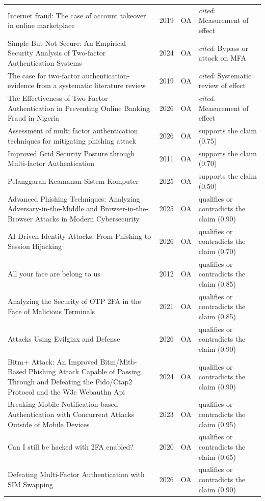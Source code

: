 \begin{longtable}{@{}%
  >{\raggedright\arraybackslash}p{}c%
  >{\raggedright\arraybackslash}p{}%
  >{\raggedright\arraybackslash}p{}@{}}
Internet fraud: The case of account takeover in online marketplace & 2019 & OA & \emph{cited}: Measurement of effect \\
Simple But Not Secure: An Empirical Security Analysis of Two-factor Authentication Systems & 2024 & OA & \emph{cited}: Bypass or attack on MFA \\
The case for two-factor authentication- evidence from a systematic literature review & 2019 & OA & \emph{cited}: Systematic review of effect \\
The Effectiveness of Two-Factor Authentication in Preventing Online Banking Fraud in Nigeria & 2026 & OA & \emph{cited}: Measurement of effect \\
Assessment of multi factor authentication techniques for mitigating phishing attack & 2026 & OA & supports the claim (0.75) \\
Improved Grid Security Posture through Multi-factor Authentication & 2011 & OA & supports the claim (0.70) \\
Pelanggaran Keamanan Sistem Komputer & 2025 & OA & supports the claim (0.50) \\
Advanced Phishing Techniques: Analyzing Adversary-in-the-Middle and Browser-in-the-Browser Attacks in Modern Cybersecurity & 2025 & OA & qualifies or contradicts the claim (0.90) \\
AI-Driven Identity Attacks: From Phishing to Session Hijacking & 2026 & OA & qualifies or contradicts the claim (0.70) \\
All your face are belong to us & 2012 & OA & qualifies or contradicts the claim (0.85) \\
Analyzing the Security of OTP 2FA in the Face of Malicious Terminals & 2021 & OA & qualifies or contradicts the claim (0.85) \\
Attacks Using Evilginx and Defense & 2026 & OA & qualifies or contradicts the claim (0.90) \\
Bitm+ Attack: An Improved Bitm/Mitb-Based Phishing Attack Capable of Passing Through and Defeating the Fido/Ctap2 Protocol and the W3c Webauthn Api & 2024 & OA & qualifies or contradicts the claim (0.90) \\
Breaking Mobile Notification-based Authentication with Concurrent Attacks Outside of Mobile Devices & 2023 & OA & qualifies or contradicts the claim (0.95) \\
Can I still be hacked with 2FA enabled? & 2020 & OA & qualifies or contradicts the claim (0.65) \\
Defeating Multi-Factor Authentication with SIM Swapping & 2026 & OA & qualifies or contradicts the claim (0.90) \\

\end{longtable}
